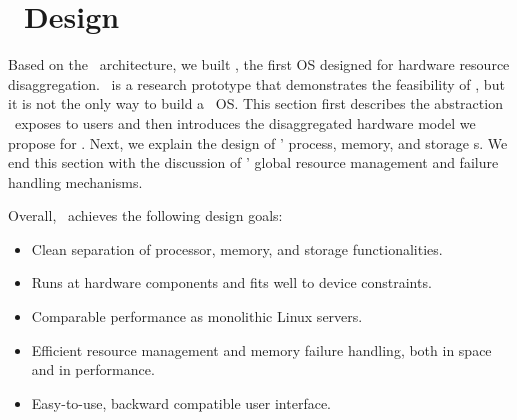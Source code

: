 \documentclass[10pt,times,twocolumn]{z2-article}
\begin{document}
{{{{{{{\fi
\section{\lego\ Design}
\label{sec:design}

Based on the \splitkernel\ architecture,
we built {\em \lego}, the first OS designed for hardware resource disaggregation.
\lego\ is a research prototype that demonstrates the feasibility of \splitkernel,
but it is not the only way to build a \splitkernel\ OS.
This section first describes the abstraction \lego\ exposes to users
and then introduces the disaggregated hardware model we propose for \lego.
Next, we explain the design of \lego' process, memory, and storage \microos{}s.
We end this section with the discussion of \lego' global resource management and failure handling mechanisms.

Overall, \lego\ achieves the following design goals:

\begin{itemize}


\item Clean separation of processor, memory, and storage functionalities.

\item Runs at hardware components and fits well to device constraints.

\item Comparable performance as monolithic Linux servers.

\item Efficient resource management and memory failure handling, both in space and in performance. %

\item Easy-to-use, backward compatible user interface.


\end{itemize}}}}}}}}
\end{document}

